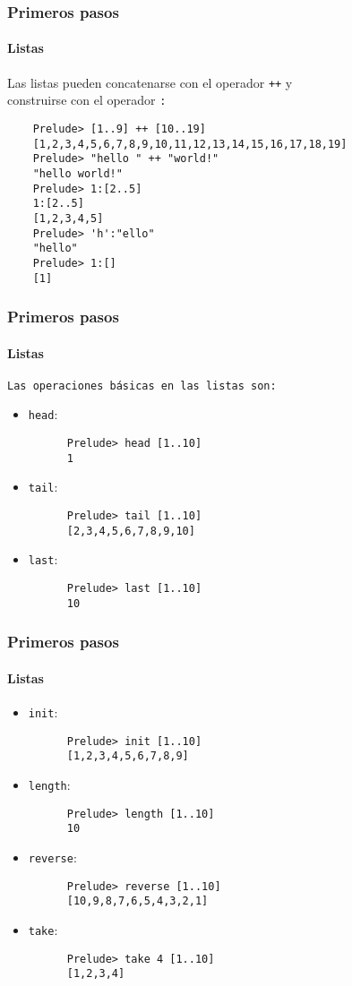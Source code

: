 \documentclass{beamer}
\begin{document}
\begin{frame}[fragile]
  \frametitle{Primeros pasos}
  \framesubtitle{Listas}
  Las listas pueden concatenarse con el operador \verb~++~ y\\construirse con el operador \verb~:~
  \begin{verbatim}
    Prelude> [1..9] ++ [10..19]
    [1,2,3,4,5,6,7,8,9,10,11,12,13,14,15,16,17,18,19]
    Prelude> "hello " ++ "world!"
    "hello world!"
    Prelude> 1:[2..5]
    1:[2..5]
    [1,2,3,4,5]
    Prelude> 'h':"ello"
    "hello"
    Prelude> 1:[]
    [1]
  \end{verbatim}
\end{frame}

\begin{frame}[fragile]
  \frametitle{Primeros pasos}
  \framesubtitle{Listas}
  \texttt{Las operaciones básicas en las listas son:}
  \begin{itemize}
  \item \verb~head~:
    \begin{verbatim}
      Prelude> head [1..10]
      1
    \end{verbatim}
  \item \verb~tail~:
    \begin{verbatim}
      Prelude> tail [1..10]
      [2,3,4,5,6,7,8,9,10]
    \end{verbatim}
  \item \verb~last~:
    \begin{verbatim}
      Prelude> last [1..10]
      10
    \end{verbatim}

  \end{itemize}
\end{frame}

\begin{frame}[fragile]
  \frametitle{Primeros pasos}
  \framesubtitle{Listas}
  \begin{itemize}
  \item \verb~init~:
    \begin{verbatim}
      Prelude> init [1..10]
      [1,2,3,4,5,6,7,8,9]
    \end{verbatim}
  \item \verb~length~:
    \begin{verbatim}
      Prelude> length [1..10]
      10
    \end{verbatim}
  \item \verb~reverse~:
    \begin{verbatim}
      Prelude> reverse [1..10]
      [10,9,8,7,6,5,4,3,2,1]
    \end{verbatim}
  \item \verb~take~:
    \begin{verbatim}
      Prelude> take 4 [1..10]
      [1,2,3,4]
    \end{verbatim}
  \end{itemize}
\end{frame}
\end{document}
